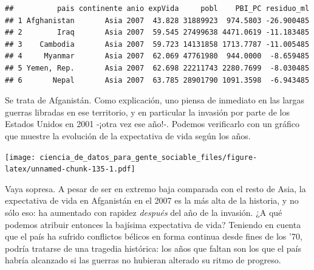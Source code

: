 \documentclass[spanish,]{book}
\newenvironment{Shaded}{\begin{snugshade}}{\end{snugshade}}
\newcommand{\DataTypeTok}[1]{\textcolor[rgb]{0.13,0.29,0.53}{#1}}
\newcommand{\KeywordTok}[1]{\textcolor[rgb]{0.13,0.29,0.53}{\textbf{#1}}}
\newcommand{\NormalTok}[1]{#1}
\newcommand{\OperatorTok}[1]{\textcolor[rgb]{0.81,0.36,0.00}{\textbf{#1}}}
\newcommand{\StringTok}[1]{\textcolor[rgb]{0.31,0.60,0.02}{#1}}
\begin{document}
\begin{verbatim}
##          pais continente anio expVida     pobl    PBI_PC residuo_ml
## 1 Afghanistan       Asia 2007  43.828 31889923  974.5803 -26.900485
## 2        Iraq       Asia 2007  59.545 27499638 4471.0619 -11.183485
## 3    Cambodia       Asia 2007  59.723 14131858 1713.7787 -11.005485
## 4     Myanmar       Asia 2007  62.069 47761980  944.0000  -8.659485
## 5 Yemen, Rep.       Asia 2007  62.698 22211743 2280.7699  -8.030485
## 6       Nepal       Asia 2007  63.785 28901790 1091.3598  -6.943485
\end{verbatim}

Se trata de Afganistán. Como explicación, uno piensa de inmediato en las largas guerras libradas en ese territorio, y en particular la invasión por parte de los Estados Unidos en 2001 -¡otra vez ese año!-. Podemos verificarlo con un gráfico que muestre la evolución de la expectativa de vida según los años.

\begin{Shaded}
\end{Shaded}

\texttt{[image: ciencia\_de\_datos\_para\_gente\_sociable\_files/figure-latex/unnamed-chunk-135-1.pdf]}

Vaya sopresa. A pesar de ser en extremo baja comparada con el resto de Asia, la expectativa de vida en Afganistán en el 2007 es la más alta de la historia, y no sólo eso: ha aumentado con rapidez \emph{después} del año de la invasión. ¿A qué podemos atribuir entonces la bajísima expectativa de vida? Teniendo en cuenta que el país ha sufrido conflictos bélicos en forma continua desde fines de los '70, podría tratarse de una tragedia histórica: los años que faltan son los que el país habría alcanzado si las guerras no hubieran alterado su ritmo de progreso.
\end{document}
